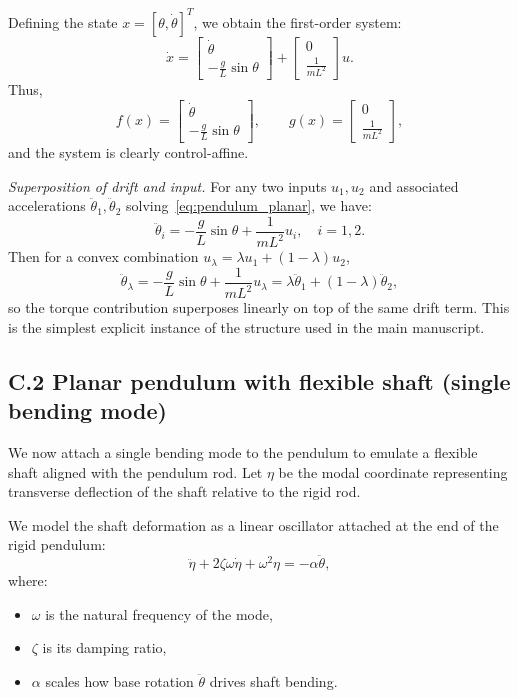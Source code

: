 \documentclass[12pt]{article}
\begin{document}
Defining the state \(x = [\theta, \dot{\theta}]^T\), we obtain the first-order system:
\begin{equation}
  \dot{x}
  =
  \begin{bmatrix}
    \dot{\theta} \\
    -\frac{g}{L} \sin\theta
  \end{bmatrix}
  +
  \begin{bmatrix}
    0 \\
    \frac{1}{m L^2}
  \end{bmatrix} u.
\end{equation}
Thus,
\[
  f(x) =
  \begin{bmatrix}
    \dot{\theta} \\
    -\frac{g}{L} \sin\theta
  \end{bmatrix},
  \qquad
  g(x) =
  \begin{bmatrix}
    0 \\
    \frac{1}{m L^2}
  \end{bmatrix},
\]
and the system is clearly control-affine.

\emph{Superposition of drift and input.}  
For any two inputs \(u_1,u_2\) and associated accelerations \(\ddot{\theta}_1, \ddot{\theta}_2\) solving~\eqref{eq:pendulum_planar}, we have:
\[
  \ddot{\theta}_i
  =
  -\frac{g}{L}\sin\theta
  +
  \frac{1}{mL^2}u_i, \quad i=1,2.
\]
Then for a convex combination \(u_\lambda = \lambda u_1 + (1-\lambda)u_2\),
\[
  \ddot{\theta}_\lambda
  =
  -\frac{g}{L}\sin\theta
  +
  \frac{1}{mL^2}u_\lambda
  =
  \lambda \ddot{\theta}_1 + (1-\lambda)\ddot{\theta}_2,
\]
so the torque contribution superposes linearly on top of the same drift term. This is the simplest explicit instance of the structure used in the main manuscript.

\subsection{C.2 \quad Planar pendulum with flexible shaft (single bending mode)}

We now attach a single bending mode to the pendulum to emulate a flexible shaft aligned with the pendulum rod. Let \(\eta\) be the modal coordinate representing transverse deflection of the shaft relative to the rigid rod.

We model the shaft deformation as a linear oscillator attached at the end of the rigid pendulum:
\begin{equation}
  \ddot{\eta} + 2\zeta\omega \dot{\eta} + \omega^2 \eta = -\alpha \ddot{\theta},
  \label{eq:eta_planar}
\end{equation}
where:
\begin{itemize}
  \item \(\omega\) is the natural frequency of the mode,
  \item \(\zeta\) is its damping ratio,
  \item \(\alpha\) scales how base rotation \(\ddot{\theta}\) drives shaft bending.
\end{itemize}
\end{document}
